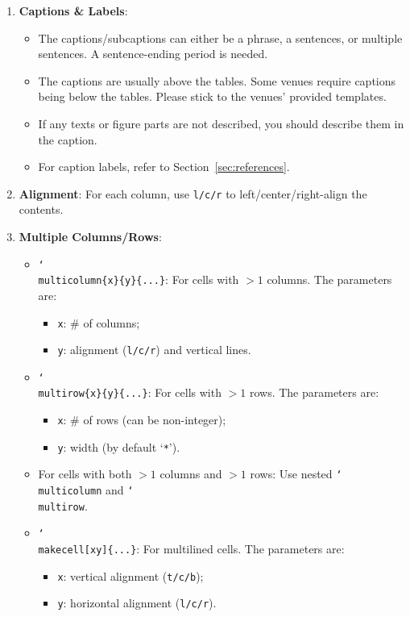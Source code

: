\begin{enumerate}
\begin{itemize}
  \end{itemize}

  \item \textbf{Captions \& Labels}:
  \begin{itemize}
    \item The captions/subcaptions can either be a phrase, a sentences, or multiple sentences. A sentence-ending period is needed.
    \item The captions are usually above the tables. Some venues require captions being below the tables. Please stick to the venues' provided templates.
    \item If any texts or figure parts are not described, you should describe them in the caption.
    \item For caption labels, refer to Section~\ref{sec:references}.
  \end{itemize}

  \item \textbf{Alignment}:
    For each column, use \texttt{l/c/r} to left/center/right-align the contents.

  \item \textbf{Multiple Columns/Rows}:
  \begin{itemize}
    \item
      \texttt{\char`\\multicolumn\{x\}\{y\}\{...\}}: For cells with $>1$ columns.
      The parameters are:
    \begin{itemize}
      \item \texttt{x}: \# of columns;
      \item \texttt{y}: alignment (\texttt{l/c/r}) and vertical lines.
    \end{itemize}
    \item
      \texttt{\char`\\multirow\{x\}\{y\}\{...\}}: For cells with $>1$ rows.
      The parameters are:
    \begin{itemize}
      \item \texttt{x}: \# of rows (can be non-integer);
      \item \texttt{y}: width (by default `\texttt{*}').
    \end{itemize}
    \item For cells with both $>1$ columns and $>1$ rows: Use nested \texttt{\char`\\multicolumn} and \texttt{\char`\\multirow}.
    \item
      \texttt{\char`\\makecell[xy]\{...\}}: For multilined cells.
      The parameters are:
    \begin{itemize}
      \item \texttt{x}: vertical alignment (\texttt{t/c/b});
      \item \texttt{y}: horizontal alignment (\texttt{l/c/r}).
    \end{itemize}
  \end{itemize}


\end{enumerate}

